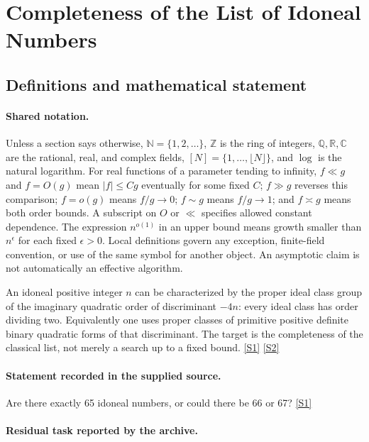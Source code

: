 \documentclass[11pt,a4paper]{article}
\newcommand{\N}{\mathbb{N}}
\newcommand{\Z}{\mathbb{Z}}
\newcommand{\Q}{\mathbb{Q}}
\newcommand{\R}{\mathbb{R}}
\newcommand{\C}{\mathbb{C}}
\newcommand{\sref}[2]{\hyperlink{source:#1:#2}{[S#2]}}
\begin{document}
\section{Completeness of the List of Idoneal Numbers}\label{statement}


\subsection{Definitions and mathematical statement}

\paragraph{Shared notation.}Unless a section says otherwise, $\N=\{1,2,\ldots\}$,
$\Z$ is the ring of integers, $\Q,\R,\C$ are the rational, real, and complex
fields, $[N]=\{1,\ldots,\lfloor N\rfloor\}$, and $\log$ is the natural
logarithm. For real functions of a parameter tending to infinity,
$f\ll g$ and $f=O(g)$ mean $|f|\leq Cg$ eventually for some fixed $C$;
$f\gg g$ reverses this comparison; $f=o(g)$ means $f/g\to0$;
$f\sim g$ means $f/g\to1$; and $f\asymp g$ means both order bounds.
A subscript on $O$ or $\ll$ specifies allowed constant dependence.
The expression $n^{o(1)}$ in an upper bound means growth smaller than
$n^\epsilon$ for each fixed $\epsilon>0$. Local definitions govern any
exception, finite-field convention, or use of the same symbol for another
object. An asymptotic claim is not automatically an effective algorithm.



An idoneal positive integer $n$ can be characterized by the proper ideal class group of the imaginary quadratic order of discriminant $-4n$: every ideal class has order dividing two. Equivalently one uses proper classes of primitive positive definite binary quadratic forms of that discriminant. The target is the completeness of the classical list, not merely a search up to a fixed bound. \sref{statement}{1} \sref{statement}{2}

\paragraph{Statement recorded in the supplied source.}
Are there exactly 65 idoneal numbers, or could there be 66 or 67? \sref{statement}{1}

\paragraph{Residual task reported by the archive.}
\end{document}
